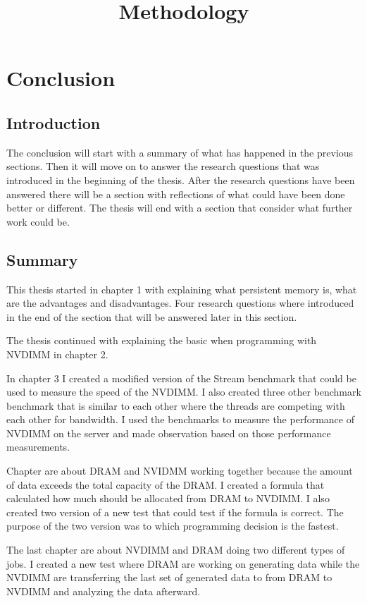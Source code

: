 \documentclass[12pt,a4paper,USenglish]{article}      %
\title{Methodology}  %
\begin{document}

\section{Conclusion}
\subsection{Introduction}
The conclusion will start with a summary of what has happened in the previous sections. Then it will move on to answer the research questions that was introduced in the beginning of the thesis. After the research questions have been answered there will be a section with reflections of what could have been done better or different. The thesis will end with a section that consider what further work could be. 

\subsection{Summary}
This thesis started in chapter 1 with explaining what persistent memory is, what are the advantages and disadvantages. Four research questions where introduced in the end of the section that will be answered later in this section. 

The thesis continued with explaining the basic when programming with NVDIMM in chapter 2. 

In chapter 3 I created a modified version of the Stream benchmark that could be used to measure the speed of the NVDIMM. I also created three other benchmark benchmark that is similar to each other where the threads are competing with each other for bandwidth. I used the benchmarks to measure the performance of NVDIMM on the server and made observation based on those performance measurements. 

Chapter are about DRAM and NVIDMM working together because the amount of data exceeds the total capacity of the DRAM.
I created a formula that calculated how much should be allocated from DRAM to NVDIMM. I also created two version of a new test that could test if the formula is correct. The purpose of the two version was to which programming decision is the fastest.

The last chapter are about NVDIMM and DRAM doing two different types of jobs. I created a new test where DRAM are working on generating data while the NVDIMM are transferring the last set of generated data to from DRAM to NVDIMM and analyzing the data afterward.
\end{document}
